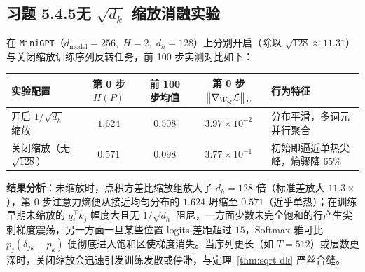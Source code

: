 \subsection*{习题 5.4.5\quad 无 $\sqrt{d_k}$ 缩放消融实验}
在 \texttt{MiniGPT}（$d_{\text{model}} = 256,\; H = 2,\; d_h = 128$）上分别开启（除以 $\sqrt{128} \approx 11.31$）与关闭缩放训练序列反转任务，前 100 步实测对比如下：
\begin{center}
\footnotesize
\begin{tabularx}{\linewidth}{@{}lcccX@{}}
\toprule
实验配置 & 第 0 步 $H(P)$ & 前 100 步均值 & 第 0 步 $\left\|\nabla_{W_Q}\mathcal{L}\right\|_F$ & 行为特征 \\
\midrule
开启 $1/\sqrt{d_h}$ 缩放 & $1.624$ & $0.508$ & $3.97 \times 10^{-2}$ & 分布平滑，多词元并行聚合 \\
关闭缩放（无 $\sqrt{128}$） & $0.571$ & $0.098$ & $3.77 \times 10^{-1}$ & 初始即逼近单热尖峰，熵骤降 $65\%$ \\
\bottomrule
\end{tabularx}
\end{center}
\textbf{结果分析}：未缩放时，点积方差比缩放组放大了 $d_h = 128$ 倍（标准差放大 $11.3\times$），第 0 步注意力熵便从接近均匀分布的 $1.624$ 坍缩至 $0.571$（近乎单热）；在训练早期未缩放的 $q_i^\top k_j$ 幅度大且无 $1/\sqrt{d_h}$ 阻尼，一方面少数未完全饱和的行产生尖刺梯度震荡，另一方面一旦某些位置 logits 差距超过 $15$，Softmax 雅可比 $p_j(\delta_{jk}-p_k)$ 便彻底进入饱和区使梯度消失。当序列更长（如 $T = 512$）或层数更深时，关闭缩放会迅速引发训练发散或停滞，与定理~\ref{thm:sqrt-dk} 严丝合缝。

